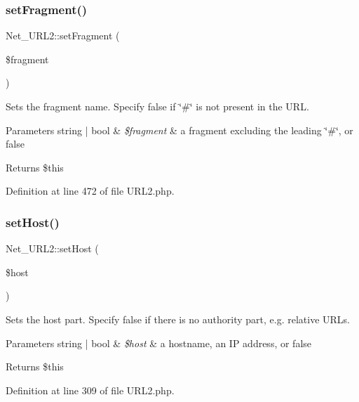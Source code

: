 \subsubsection{\texorpdfstring{set\+Fragment()}{setFragment()}}
{\footnotesize\ttfamily Net\+\_\+\+U\+R\+L2\+::set\+Fragment (\begin{DoxyParamCaption}\item[{}]{\$fragment }\end{DoxyParamCaption})}

Sets the fragment name. Specify false if \char`\"{}\#\char`\"{} is not present in the U\+RL.


\begin{DoxyParams}[1]{Parameters}
string | bool & {\em \$fragment} & a fragment excluding the leading \char`\"{}\#\char`\"{}, or false\\
\hline
\end{DoxyParams}
\begin{DoxyReturn}{Returns}
\$this 
\end{DoxyReturn}


Definition at line 472 of file U\+R\+L2.\+php.

\hypertarget{classNet__URL2_afacc7bf64786203c167c2d771f1fddf9}{}\label{classNet__URL2_afacc7bf64786203c167c2d771f1fddf9} 
\subsubsection{\texorpdfstring{set\+Host()}{setHost()}}
{\footnotesize\ttfamily Net\+\_\+\+U\+R\+L2\+::set\+Host (\begin{DoxyParamCaption}\item[{}]{\$host }\end{DoxyParamCaption})}

Sets the host part. Specify false if there is no authority part, e.\+g. relative U\+R\+Ls.


\begin{DoxyParams}[1]{Parameters}
string | bool & {\em \$host} & a hostname, an IP address, or false\\
\hline
\end{DoxyParams}
\begin{DoxyReturn}{Returns}
\$this 
\end{DoxyReturn}


Definition at line 309 of file U\+R\+L2.\+php.

